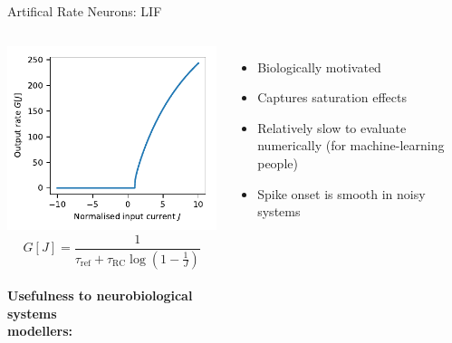 \documentclass[handout,aspectratio=169]{beamer}
\begin{document}
\begin{frame}{Artifical Rate Neurons: LIF}
	\begin{columns}
		\includegraphics[width=\textwidth]{media/nonlinearity_lif.pdf}
		$$G[J] = \frac{1}{\tau_\mathrm{ref} + \tau_\mathrm{RC} \log\left( 1 - \frac{1}J \right)}$$\\[0.5cm]
		\textbf{Usefulness to neurobiological systems\\modellers:}
		\begin{itemize}
			\item[\OPlus] Biologically motivated
			\item[\OPlus] Captures saturation effects
			\item[\OMeh] Relatively slow to evaluate numerically (for machine-learning people)
			\item[\OMinus] Spike onset is smooth in noisy systems
		\end{itemize}
	\end{columns}	
\end{frame}
\end{document}
